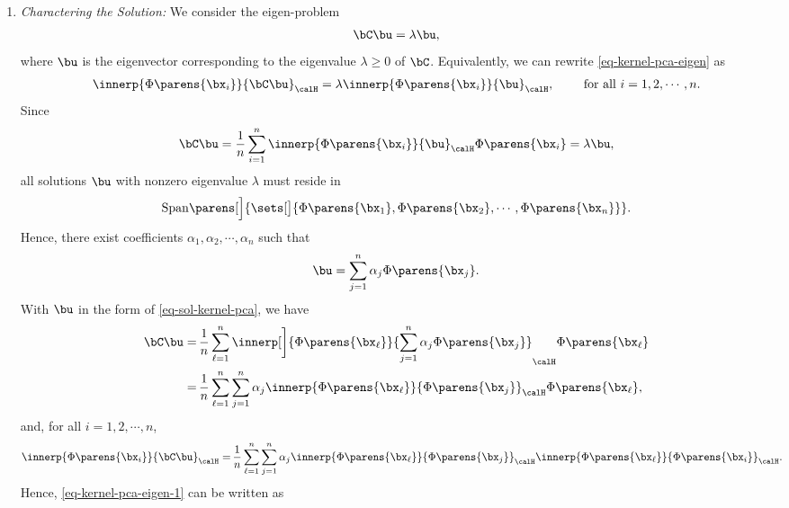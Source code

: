 \documentclass[12pt]{article}
\begin{document}
\begin{enumerate}[label=\textbf{\arabic*.}]
	\begin{enumerate}
		\item \textit{Charactering the Solution:} We consider the eigen-problem 
		\begin{align}\label{eq-kernel-pca-eigen}
			\bC \bu = \lambda \bu, 
		\end{align}
		where $\bu$ is the eigenvector corresponding to the eigenvalue $\lambda \ge 0$ of $\bC$. Equivalently, we can rewrite \eqref{eq-kernel-pca-eigen} as 
		\begin{align}\label{eq-kernel-pca-eigen-1}
			\innerp{\Phi \parens{\bx_i}}{\bC \bu}_{\calH} = \lambda \innerp{\Phi \parens{\bx_i}}{\bu}_{\calH}, \qquad \text{ for all } i = 1, 2, \cdots, n. 
		\end{align}
		Since 
		\begin{align*}
			\bC \bu = \frac{1}{n} \sum_{i=1}^n \innerp{\Phi \parens{\bx_i}}{\bu}_{\calH} \Phi \parens{\bx_i} = \lambda \bu, 
		\end{align*}
		all solutions $\bu$ with nonzero eigenvalue $\lambda$ must reside in 
		\begin{align*}
			\mathrm{Span} \parens[\Big]{ \sets[\big]{\Phi \parens{\bx_1}, \Phi \parens{\bx_2}, \cdots, \Phi \parens{\bx_n}}}. 
		\end{align*}
		Hence, there exist coefficients $\alpha_1, \alpha_2, \cdots, \alpha_n$ such that 
		\begin{align}\label{eq-sol-kernel-pca}
			\bu = \sum_{j=1}^n \alpha_j \Phi \parens{\bx_j}. 
		\end{align}
		With $\bu$ in the form of \eqref{eq-sol-kernel-pca}, we have 
		\begin{align*}
			\bC \bu = & \, \frac{1}{n} \sum_{\ell=1}^n \innerp[\bigg]{\Phi \parens{\bx_\ell}}{ \sum_{j=1}^n \alpha_j \Phi \parens{\bx_j} }_{\calH} \Phi \parens{\bx_{\ell}} \\ 
			= & \, \frac{1}{n} \sum_{\ell=1}^n \sum_{j=1}^n \alpha_j \innerp{\Phi \parens{\bx_{\ell}}}{ \Phi \parens{\bx_j} }_{\calH} \Phi \parens{\bx_{\ell}}, 
		\end{align*}
		and, for all $i = 1, 2, \cdots, n$, 
		\begin{align*}
			\innerp{\Phi \parens{\bx_i}}{\bC \bu}_{\calH} = & \, \frac{1}{n} \sum_{\ell=1}^n \sum_{j=1}^n \alpha_j \innerp{\Phi \parens{\bx_{\ell}}}{ \Phi \parens{\bx_j} }_{\calH} \innerp{\Phi \parens{\bx_{\ell}}}{\Phi \parens{\bx_i}}_{\calH}. 
		\end{align*}
		Hence, \eqref{eq-kernel-pca-eigen-1} can be written as 
		\begin{align}\label{eq-kernel-pca-eigen-eq-2}

\end{align}
\end{enumerate}
\end{enumerate}
\end{document}
